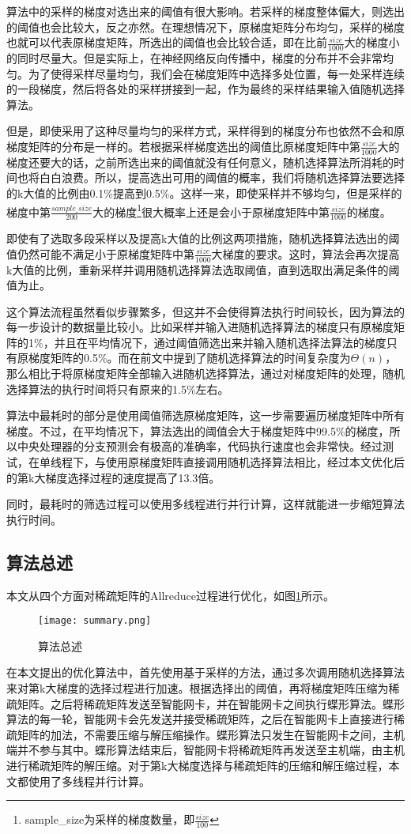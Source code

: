 算法中的采样的梯度对选出来的阈值有很大影响。若采样的梯度整体偏大，则选出的阈值也会比较大，反之亦然。在理想情况下，原梯度矩阵分布均匀，采样的梯度也就可以代表原梯度矩阵，所选出的阈值也会比较合适，即在比前$\frac{size}{1000}$大的梯度小的同时尽量大。但是实际上，在神经网络反向传播中，梯度的分布并不会非常均匀。为了使得采样尽量均匀，我们会在梯度矩阵中选择多处位置，每一处采样连续的一段梯度，然后将各处的采样拼接到一起，作为最终的采样结果输入值随机选择算法。

但是，即使采用了这种尽量均匀的采样方式，采样得到的梯度分布也依然不会和原梯度矩阵的分布是一样的。若根据采样梯度选出的阈值比原梯度矩阵中第$\frac{size}{1000}$大的梯度还要大的话，之前所选出来的阈值就没有任何意义，随机选择算法所消耗的时间也将白白浪费。所以，提高选出可用的阈值的概率，我们将随机选择算法要选择的k大值的比例由0.1\%提高到0.5\%。这样一来，即使采样并不够均匀，但是采样的梯度中第$\frac{sample\_size}{200}$大的梯度\footnote{sample\_size为采样的梯度数量，即$\frac{size}{100}$}很大概率上还是会小于原梯度矩阵中第$\frac{size}{1000}$的梯度。

即使有了选取多段采样以及提高k大值的比例这两项措施，随机选择算法选出的阈值仍然可能不满足小于原梯度矩阵中第$\frac{size}{1000}$大梯度的要求。这时，算法会再次提高k大值的比例，重新采样并调用随机选择算法选取阈值，直到选取出满足条件的阈值为止。

这个算法流程虽然看似步骤繁多，但这并不会使得算法执行时间较长，因为算法的每一步设计的数据量比较小。比如采样并输入进随机选择算法的梯度只有原梯度矩阵的1\%，并且在平均情况下，通过阈值筛选出来并输入随机选择法算法的梯度只有原梯度矩阵的0.5\%。而在前文中提到了随机选择算法的时间复杂度为$\Theta(n)$，那么相比于将原梯度矩阵全部输入进随机选择算法，通过对梯度矩阵的处理，随机选择算法的执行时间将只有原来的1.5\%左右。

算法中最耗时的部分是使用阈值筛选原梯度矩阵，这一步需要遍历梯度矩阵中所有梯度。不过，在平均情况下，算法选出的阈值会大于梯度矩阵中99.5\%的梯度，所以中央处理器的分支预测会有极高的准确率，代码执行速度也会非常快。经过测试，在单线程下，与使用原梯度矩阵直接调用随机选择算法相比，经过本文优化后的第k大梯度选择过程的速度提高了13.3倍。

同时，最耗时的筛选过程可以使用多线程进行并行计算，这样就能进一步缩短算法执行时间。

\subsection{算法总述}
本文从四个方面对稀疏矩阵的Allreduce过程进行优化，如图\ref{fig:summary}所示。

\begin{figure}[ht] %
  \centering
  \texttt{[image: summary.png]}
  \caption{算法总述}
  \label{fig:summary}
\end{figure}

在本文提出的优化算法中，首先使用基于采样的方法，通过多次调用随机选择算法来对第k大梯度的选择过程进行加速。根据选择出的阈值，再将梯度矩阵压缩为稀疏矩阵。之后将稀疏矩阵发送至智能网卡，并在智能网卡之间执行蝶形算法。蝶形算法的每一轮，智能网卡会先发送并接受稀疏矩阵，之后在智能网卡上直接进行稀疏矩阵的加法，不需要压缩与解压缩操作。蝶形算法只发生在智能网卡之间，主机端并不参与其中。蝶形算法结束后，智能网卡将稀疏矩阵再发送至主机端，由主机进行稀疏矩阵的解压缩。对于第k大梯度选择与稀疏矩阵的压缩和解压缩过程，本文都使用了多线程并行计算。